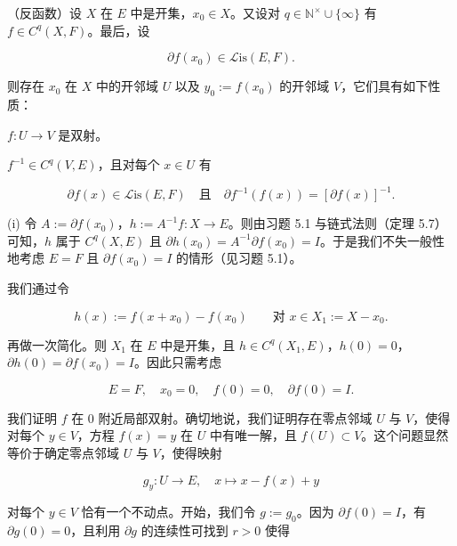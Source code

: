 \begin{theorem}

（反函数）设 $ X $ 在 $ E $ 中是开集，$ x_{0} \in X $。又设对 $ q \in \mathbb{N}^{\times} \cup \{\infty\} $ 有 $ f \in C^{q}(X, F) $。最后，设

\[
\partial f(x_{0}) \in \mathcal{L}\mathrm{is}(E, F) .
\]

则存在 $ x_{0} $ 在 $ X $ 中的开邻域 $ U $ 以及 $ y_{0} := f(x_{0}) $ 的开邻域 $ V $，它们具有如下性质：

\begin{subitems}
\item

$ f : U \to V $ 是双射。

\item

$ f^{-1} \in C^{q}(V, E) $，且对每个 $ x \in U $ 有

\[
\partial f(x) \in \mathcal{L}\mathrm{is}(E, F) \quad \text{且} \quad \partial f^{-1}(f(x)) = \left[\partial f(x)\right]^{-1} .
\]

\proofhead
(i) 令 $ A := \partial f(x_{0}) $，$ h := A^{-1}f : X \to E $。则由习题 5.1 与链式法则（定理 5.7）可知，$ h $ 属于 $ C^{q}(X, E) $ 且 $ \partial h(x_{0}) = A^{-1}\partial f(x_{0}) = I $。于是我们不失一般性地考虑 $ E = F $ 且 $ \partial f(x_{0}) = I $ 的情形（见习题 5.1）。
\end{subitems}

\begin{subitems}
\item[（ii）]

我们通过令

\[
h(x) := f(x + x_{0}) - f(x_{0}) \qquad \text{对 } x \in X_{1} := X - x_{0} .
\]

再做一次简化。则 $ X_{1} $ 在 $ E $ 中是开集，且 $ h \in C^{q}(X_{1}, E) $，$ h(0) = 0 $，$ \partial h(0) = \partial f(x_{0}) = I $。因此只需考虑

\[
E = F , \quad x_{0} = 0 , \quad f(0) = 0 , \quad \partial f(0) = I .
\]
\item[（iii）]

我们证明 $ f $ 在 0 附近局部双射。确切地说，我们证明存在零点邻域 $ U $ 与 $ V $，使得对每个 $ y \in V $，方程 $ f(x) = y $ 在 $ U $ 中有唯一解，且 $ f(U) \subset V $。这个问题显然等价于确定零点邻域 $ U $ 与 $ V $，使得映射

\[
g_{y} : U \to E , \quad x \mapsto x - f(x) + y
\]

对每个 $ y \in V $ 恰有一个不动点。开始，我们令 $ g := g_{0} $。因为 $ \partial f(0) = I $，有 $ \partial g(0) = 0 $，且利用 $ \partial g $ 的连续性可找到 $ r > 0 $ 使得


\end{subitems}
\end{theorem}
